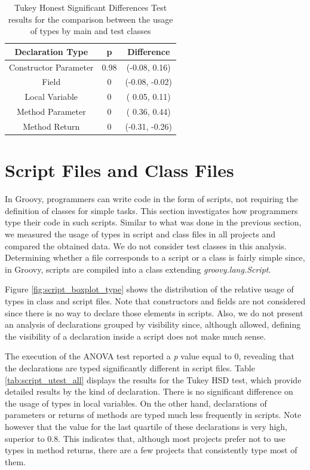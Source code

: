 \documentclass[msc]{ppgccufmg}
\begin{document}
\begin{table}[h!]
\centering{}%

\begin{tabular}{|c|c|c|}
\hline 
Declaration Type 		& p & Difference \\
\hline 
\hline 
Constructor Parameter &  0.98     & (-0.08,  0.16) \\ \hline
Field &  0          & (-0.08, -0.02)  \\ \hline
Local Variable &  0          & ( 0.05,  0.11) \\ \hline
Method Parameter &  0          & ( 0.36,  0.44) \\ \hline
Method Return &  0          & (-0.31, -0.26) \\ \hline
\end{tabular}
\caption{Tukey Honest Significant Differences Test results for the comparison between the usage of types by main and test classes}
\label{tab:test_utest_type}
\end{table}

\section{Script Files and Class Files\label{sec:results-scripts}}
In Groovy, programmers can write code in the form of scripts, not requiring the definition of classes for simple tasks.
This section investigates how programmers type their code in such scripts.
Similar to what was done in the previous section, we measured the usage of types in script and class files in all projects and compared the obtained data.
We do not consider test classes in this analysis.
Determining whether a file corresponds to a script or a class is fairly simple since, in Groovy, scripts are compiled into a class extending \emph{groovy.lang.Script}.

Figure \ref{fig:script_boxplot_type} shows the distribution of the relative usage of types in class and script files.
Note that constructors and fields are not considered since there is no way to declare those elements in scripts.
Also, we do not present an analysis of declarations grouped by visibility since, although allowed, defining the visibility of a declaration inside a script does not make much sense.


The execution of the ANOVA test reported a \emph{p} value equal to 0, revealing that the declarations are typed significantly different in script files.
Table \ref{tab:script_utest_all} displays the results for the Tukey HSD test, which provide detailed results by the kind of declaration.
There is no significant difference on the usage of types in local variables.
On the other hand, declarations of parameters or returns of methods are typed much less frequently in scripts.
Note however that the value for the last quartile of these declarations is very high, superior to 0.8.
This indicates that, although most projects prefer not to use types in method returns, there are a few projects that consistently type most of them.
\end{document}
